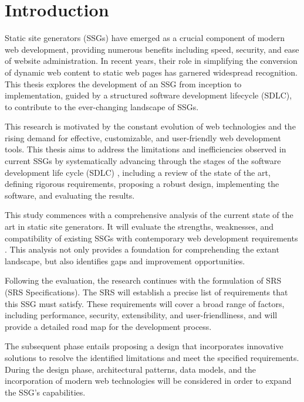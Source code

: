 

\chapter{Introduction}\label{ch:introduction}

Static site generators (SSGs)\cite{wikissg,cloudflare} have emerged as a crucial component of modern web development,
providing
numerous
benefits including speed, security, and ease of website administration. In recent years, their role in simplifying
the conversion of dynamic web content to static web pages has garnered widespread recognition. This thesis explores
the development of an SSG from inception to implementation, guided by a structured software development lifecycle
(SDLC), to contribute to the ever-changing landscape of SSGs.

This research is motivated by the constant evolution of web technologies and the rising demand for effective,
customizable, and user-friendly web development tools. This thesis aims to address the limitations and
inefficiencies
observed in current SSGs by systematically advancing through the stages of the software development life cycle (SDLC)
, including a review of the state of the art, defining rigorous requirements, proposing a robust design, implementing
the software, and evaluating the results.

This study commences with a comprehensive analysis of the current state of the art in static site generators. It will
evaluate the strengths, weaknesses, and compatibility of existing SSGs with contemporary web development
requirements\cite{khalid}
. This analysis not only provides a foundation for comprehending the extant landscape, but also identifies gaps and
improvement opportunities.

Following the evaluation, the research continues with the formulation of SRS (SRS Specifications). The SRS will
establish a precise list of requirements that this SSG must satisfy. These requirements will cover a broad
range of factors, including performance, security, extensibility, and user-friendliness, and will provide a detailed
road map for the development process.

The subsequent phase entails proposing a design that incorporates innovative solutions to resolve the identified
limitations and meet the specified requirements. During the design phase, architectural patterns, data models, and
the incorporation of modern web technologies will be considered in order to expand the SSG's capabilities.

